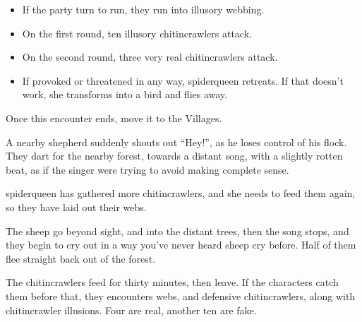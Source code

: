 \begin{multicols}{2}
\begin{rollchart}
\end{rollchart}

\begin{itemize}

	\item{If the party turn to run, they run into illusory webbing.}

	\item{On the first round, ten illusory chitincrawlers attack.}

	\item{On the second round, three very real chitincrawlers attack.}

	\item{If provoked or threatened in any way, \gls{spiderqueen} retreats.  If that doesn't work, she transforms into a bird and flies away.}

\end{itemize}


\chitincrawler

Once this encounter ends, move it to the Villages.


\begin{boxtext}

	A nearby shepherd suddenly shouts out ``Hey!'', as he loses control of his flock.  They dart for the nearby forest, towards a distant song, with a slightly rotten beat, as if the singer were trying to avoid making complete sense.

\end{boxtext}

\Gls{spiderqueen} has gathered more chitincrawlers, and she needs to feed them again, so they have laid out their webs.

\begin{boxtext}

	The sheep go beyond sight, and into the distant trees, then the song stops, and they begin to cry out in a way you've never heard sheep cry before.  Half of them flee straight back out of the forest.

\end{boxtext}

The chitincrawlers feed for thirty minutes, then leave.  If the characters catch them before that, they encounters webs, and defensive chitincrawlers, along with chitincrawler illusions.  Four are real, another ten are fake.


\end{multicols}
